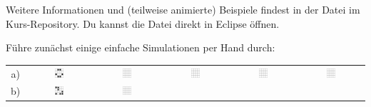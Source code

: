 Weitere Informationen und (teilweise animierte) Beispiele findest in der Datei
 im Kurs-Repository. Du kannst die Datei direkt in
Eclipse öffnen.

\pagebreak

Führe zunächst einige einfache Simulationen per Hand durch:

\begin{tabular}{cccccc}
a) &
\includegraphics[width=0.15\textwidth]{./inf/SEKII/18_Java_Arrays/GoL2.png} &
\includegraphics[width=0.15\textwidth]{./inf/SEKII/18_Java_Arrays/GoL.png} &
\includegraphics[width=0.15\textwidth]{./inf/SEKII/18_Java_Arrays/GoL.png} &
\includegraphics[width=0.15\textwidth]{./inf/SEKII/18_Java_Arrays/GoL.png} &
\includegraphics[width=0.15\textwidth]{./inf/SEKII/18_Java_Arrays/GoL.png} \\
b) &
\includegraphics[width=0.15\textwidth]{./inf/SEKII/18_Java_Arrays/GoL3.png} &
\includegraphics[width=0.15\textwidth]{./inf/SEKII/18_Java_Arrays/GoL.png} &

\end{tabular}
